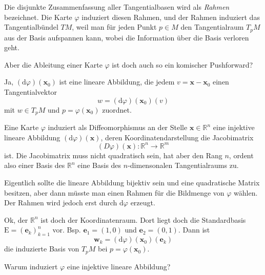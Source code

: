 \documentclass{beamer}
\newcommand{\R}{\mathbb R}
\begin{document}
\begin{frame}
Die disjunkte Zusammenfassung aller Tangentialbasen wird als
\emph{Rahmen} bezeichnet. Die Karte $\varphi$ induziert diesen
Rahmen, und der Rahmen induziert das Tangentialbündel $TM$, weil
man für jeden Punkt $p\in M$ den Tangentialraum $T_pM$ aus der Basis
aufspannen kann, wobei die Information über die Basis verloren geht.
\end{frame}

\begin{frame}
Aber die Ableitung einer Karte $\varphi$ ist doch auch so ein
komischer Pushforward?
\end{frame}

\begin{frame}
Ja, $(\mathrm d\varphi)(\mathbf x_0)$ ist eine lineare Abbildung,
die jedem $v=\mathbf x-\mathbf x_0$ einen Tangentialvektor
\[w = (\mathrm d\varphi)(\mathbf x_0)(v)\]
mit $w\in T_pM$ und $p=\varphi(\mathbf x_0)$ zuordnet.
\end{frame}

\begin{frame}
Eine Karte $\varphi$ induziert als Diffeomorphismus an der Stelle
$\mathbf x\in\R^n$ eine injektive lineare
Abbildung $(\mathrm d\varphi)(\mathbf x)$, deren Koordinatendarstellung die
Jacobimatrix
\[(D\varphi)(\mathbf x)\colon\R^n\to\R^m\]
ist.
Die Jacobimatrix muss nicht quadratisch sein, hat aber den Rang $n$,
ordent also einer Basis des $\R^n$ eine Basis des $n$-dimensonalen
Tangentialraums zu.
\end{frame}

\begin{frame}
Eigentlich sollte die lineare Abbildung bijektiv sein und eine quadratische
Matrix besitzen, aber dann müsste
man einen Rahmen für die Bildmenge von $\varphi$ wählen. Der Rahmen
wird jedoch erst durch $\mathrm d\varphi$ erzeugt.
\end{frame}

\begin{frame}
Ok, der $\R^n$ ist doch der Koordinatenraum. Dort liegt doch die
Standardbasis $\mathrm E=(\mathbf e_k)_{k=1}^n$ vor. Bsp.
$\mathbf e_1=(1,0)$ und $\mathbf e_2=(0,1)$. Dann ist
\[\mathbf w_k = (\mathrm d\varphi)(\mathbf x_0)(\mathbf e_k)\]
die induzierte Basis von $T_pM$ bei $p=\varphi(\mathbf x_0)$.
\end{frame}

\begin{frame}
Warum induziert $\varphi$ eine injektive lineare Abbildung?
\end{frame}
\end{document}
